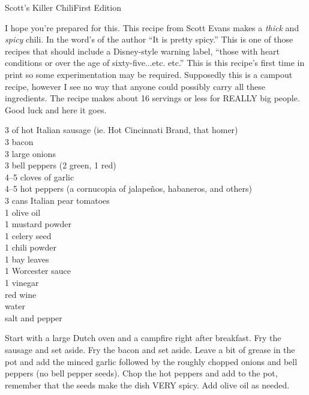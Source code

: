 \begin{entry}{Scott's Killer Chili}{First Edition}

\begin{open}
  I hope you're prepared for this.  This recipe from Scott Evans makes a {\em
  thick} and {\em spicy} chili.  In the word's of the author ``It is pretty
  spicy.''  This is one of those recipes that should include a Disney-style
  warning label, ``\textellipsis those with heart conditions or over the age of
  sixty-five...etc. etc.''  This is this recipe's first time in print so some
  experimentation may be required.  Supposedly this is a campout recipe, however
  I see no way that anyone could possibly carry all these ingredients. The
  recipe makes about 16 servings or less for REALLY big people.  Good luck and
  here it goes.
\end{open}
\begin{ingredients}
  \SI{3}{\pound} of hot Italian sausage (ie. Hot Cincinnati Brand, that homer) \\
  \SI{3}{\pound} bacon \\
  3 large onions \\
  3 bell peppers (2 green, 1 red) \\
  \numrange{4}{5} cloves of garlic \\
  \numrange{4}{5} hot peppers (a cornucopia of jalape\~{n}os, habaneros, and
  others) \\
  3 cans Italian pear tomatoes \\
  \SI{1}{\tblspoon} olive oil \\
  \SI{1}{\tblspoon} mustard powder \\
  \SI{1}{\tblspoon} celery seed \\
  \SI{1}{\tblspoon} chili powder \\
  \SI{1}{\tblspoon} bay leaves \\
  \SI{1}{\tblspoon} Worcester sauce \\
  \SI{1}{\tblspoon} vinegar \\
  red wine \\
  water \\
  salt and pepper
\end{ingredients}
Start with a large Dutch oven and a campfire right after breakfast.  Fry the
sausage and set aside.  Fry the bacon and set aside.  Leave a bit of grease in
the pot and add the minced garlic followed by the roughly chopped onions and
bell peppers (no bell pepper seeds).  Chop the hot peppers and add to the pot,
remember that the seeds make the dish VERY spicy.  Add olive oil as needed.


\end{entry}
